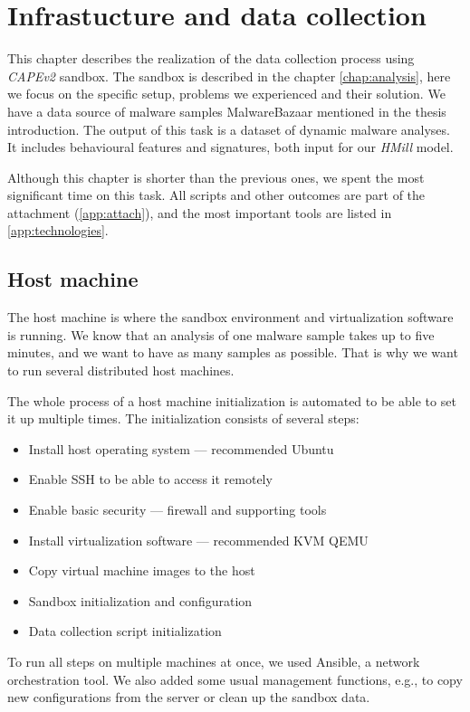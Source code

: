 \chapter{Infrastucture and data collection} \label{chap:infrastructure}
This chapter describes the realization of the data collection process using \emph{CAPEv2} sandbox. The sandbox is described in the chapter \ref{chap:analysis}, here we focus on the specific setup, problems we experienced and their solution. We have a data source of malware samples MalwareBazaar mentioned in the thesis introduction. The output of this task is a dataset of dynamic malware analyses. It includes behavioural features and signatures, both input for our \emph{HMill} model.

Although this chapter is shorter than the previous ones, we spent the most significant time on this task. All scripts and other outcomes are part of the attachment (\ref{app:attach}), and the most important tools are listed in \ref{app:technologies}.

\section{Host machine}
The host machine is where the sandbox environment and virtualization software is running. We know that an analysis of one malware sample takes up to five minutes, and we want to have as many samples as possible. That is why we want to run several distributed host machines. 

The whole process of a host machine initialization is automated to be able to set it up multiple times. The initialization consists of several steps:
\begin{itemize}
    \itemsep0em 
    \item Install host operating system --- recommended Ubuntu
    \item Enable SSH to be able to access it remotely
    \item Enable basic security --- firewall and supporting tools
    \item Install virtualization software --- recommended KVM QEMU
    \item Copy virtual machine images to the host
    \item Sandbox initialization and configuration
    \item Data collection script initialization
\end{itemize}

To run all steps on multiple machines at once, we used Ansible, a network orchestration tool. We also added some usual management functions, e.g., to copy new configurations from the server or clean up the sandbox data.

